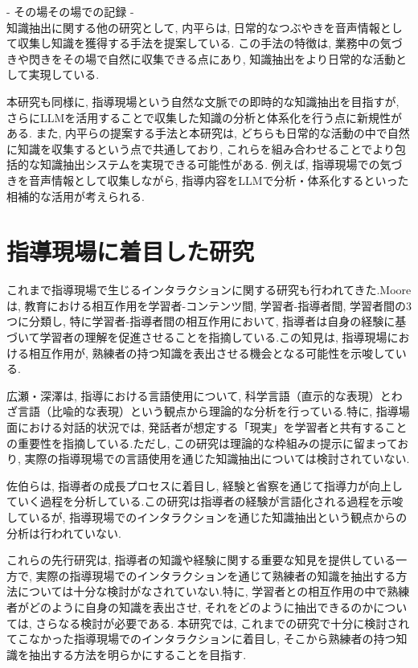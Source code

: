 - その場その場での記録 -\\
知識抽出に関する他の研究として, 内平ら\cite{Uchihira2022}は, 日常的なつぶやきを音声情報として収集し知識を獲得する手法を提案している. この手法の特徴は, 業務中の気づきや閃きをその場で自然に収集できる点にあり, 知識抽出をより日常的な活動として実現している.  

本研究も同様に, 指導現場という自然な文脈での即時的な知識抽出を目指すが, さらにLLMを活用することで収集した知識の分析と体系化を行う点に新規性がある. また, 内平らの提案する手法と本研究は, どちらも日常的な活動の中で自然に知識を収集するという点で共通しており, これらを組み合わせることでより包括的な知識抽出システムを実現できる可能性がある. 例えば, 指導現場での気づきを音声情報として収集しながら, 指導内容をLLMで分析・体系化するといった相補的な活用が考えられる.\\



\section{指導現場に着目した研究}
これまで指導現場で生じるインタラクションに関する研究も行われてきた.Moore\cite{Moore1989}は, 教育における相互作用を学習者-コンテンツ間, 学習者-指導者間, 学習者間の3つに分類し, 特に学習者-指導者間の相互作用において, 指導者は自身の経験に基づいて学習者の理解を促進させることを指摘している.この知見は, 指導現場における相互作用が, 熟練者の持つ知識を表出させる機会となる可能性を示唆している.

広瀬・深澤\cite{Hirose2018}は, 指導における言語使用について, 科学言語（直示的な表現）とわざ言語（比喩的な表現）という観点から理論的な分析を行っている.特に, 指導場面における対話的状況では, 発話者が想定する「現実」を学習者と共有することの重要性を指摘している.ただし, この研究は理論的な枠組みの提示に留まっており, 実際の指導現場での言語使用を通じた知識抽出については検討されていない.

佐伯ら\cite{Saeki2017}は, 指導者の成長プロセスに着目し, 経験と省察を通じて指導力が向上していく過程を分析している.この研究は指導者の経験が言語化される過程を示唆しているが, 指導現場でのインタラクションを通じた知識抽出という観点からの分析は行われていない.

これらの先行研究は, 指導者の知識や経験に関する重要な知見を提供している一方で, 実際の指導現場でのインタラクションを通じて熟練者の知識を抽出する方法については十分な検討がなされていない.特に, 学習者との相互作用の中で熟練者がどのように自身の知識を表出させ, それをどのように抽出できるのかについては, さらなる検討が必要である.
本研究では, これまでの研究で十分に検討されてこなかった指導現場でのインタラクションに着目し, そこから熟練者の持つ知識を抽出する方法を明らかにすることを目指す.\\




